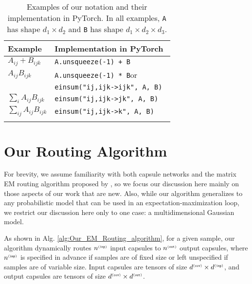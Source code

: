 \documentclass[11pt,a4paper]{article}
\newcommand{\suptag}[1]{^{{\scriptscriptstyle\tt (#1)}}}
\newcommand{\cov}{\suptag{cov}}  \newcommand{\inp}{\suptag{inp}}  \newcommand{\out}{\suptag{out}}
\begin{document}
\begin{table}[h]
	\small
	\begin{center}
		\begin{tabular}{@{}ll@{}}
			\toprule
			\bf Example & \bf Implementation in PyTorch \\
			\midrule
			\addlinespace[0.6em]
			$A_{ij} + B_{ijk}$ & {\tt A.unsqueeze(-1) + B} \\
			\addlinespace[0.6em]
			$A_{ij} B_{ijk}$ & {\tt A.unsqueeze(-1) * B}\quad or \\
			 & {\tt einsum("ij,ijk->ijk", A, B) } \\
			\addlinespace[0.6em]
			$\sum_i A_{ij} B_{ijk}$ & {\tt einsum("ij,ijk->jk", A, B)} \\
			\addlinespace[0.6em]
			$\sum_{ij} A_{ij} B_{ijk}$ & {\tt einsum("ij,ijk->k",\,A,\,B)} \\
			\addlinespace[0.6em]
			\bottomrule
		\end{tabular}
	\end{center}
	\caption{\label{tab:notation_examples}Examples of our notation and their implementation in PyTorch. In all examples, {\tt A} has shape $d_1 \times d_2$ and {\tt B} has shape $d_1 \times d_2 \times d_3$.}
\end{table}


\section{Our Routing Algorithm}\label{sec:our_routing_algorithm}

For brevity, we assume familiarity with both capsule networks and the matrix EM routing algorithm proposed by \citet{46653}, so we focus our discussion here mainly on those aspects of our work that are new. Also, while our algorithm generalizes to any probabilistic model that can be used in an expectation-maximization loop, we restrict our discussion here only to one case: a multidimensional Gaussian model.

As shown in Alg. \ref{alg:Our_EM_Routing_algorithm}, for a given sample, our algorithm dynamically routes $n\inp$ input capsules to $n\out$ output capsules, where $n\inp$ is specified in advance if samples are of fixed size or left unspecified if samples are of variable size. Input capsules are tensors of size $d\cov \times d\inp$, and output capsules are tensors of size $d\cov \times d\out$.
\end{document}
